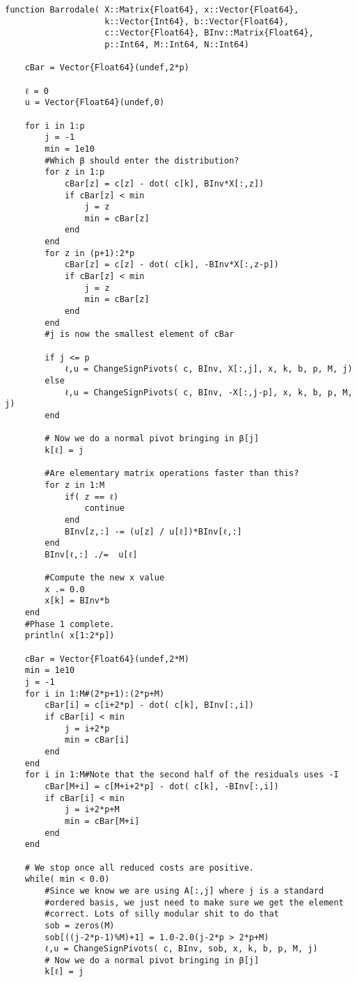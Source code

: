 \documentclass[12pt]{paper}
\begin{document}
\begin{verbatim}
function Barrodale( X::Matrix{Float64}, x::Vector{Float64},
                    k::Vector{Int64}, b::Vector{Float64},
                    c::Vector{Float64}, BInv::Matrix{Float64},
                    p::Int64, M::Int64, N::Int64)

    cBar = Vector{Float64}(undef,2*p)

    ℓ = 0
    u = Vector{Float64}(undef,0)

    for i in 1:p
        j = -1
        min = 1e10
        #Which β should enter the distribution?
        for z in 1:p
            cBar[z] = c[z] - dot( c[k], BInv*X[:,z])
            if cBar[z] < min
                j = z
                min = cBar[z]
            end
        end
        for z in (p+1):2*p
            cBar[z] = c[z] - dot( c[k], -BInv*X[:,z-p])
            if cBar[z] < min
                j = z
                min = cBar[z]
            end
        end
        #j is now the smallest element of cBar

        if j <= p 
            ℓ,u = ChangeSignPivots( c, BInv, X[:,j], x, k, b, p, M, j)
        else
            ℓ,u = ChangeSignPivots( c, BInv, -X[:,j-p], x, k, b, p, M, j)
        end

        # Now we do a normal pivot bringing in β[j]
        k[ℓ] = j

        #Are elementary matrix operations faster than this?
        for z in 1:M
            if( z == ℓ)
                continue
            end
            BInv[z,:] -= (u[z] / u[ℓ])*BInv[ℓ,:]
        end
        BInv[ℓ,:] ./=  u[ℓ]

        #Compute the new x value
        x .= 0.0
        x[k] = BInv*b
    end
    #Phase 1 complete.
    println( x[1:2*p])

    cBar = Vector{Float64}(undef,2*M)
    min = 1e10
    j = -1
    for i in 1:M#(2*p+1):(2*p+M)
        cBar[i] = c[i+2*p] - dot( c[k], BInv[:,i])
        if cBar[i] < min
            j = i+2*p
            min = cBar[i]
        end
    end
    for i in 1:M#Note that the second half of the residuals uses -I 
        cBar[M+i] = c[M+i+2*p] - dot( c[k], -BInv[:,i])
        if cBar[i] < min
            j = i+2*p+M
            min = cBar[M+i]
        end
    end

    # We stop once all reduced costs are positive.
    while( min < 0.0)
        #Since we know we are using A[:,j] where j is a standard
        #ordered basis, we just need to make sure we get the element
        #correct. Lots of silly modular shit to do that
        sob = zeros(M)
        sob[((j-2*p-1)%M)+1] = 1.0-2.0(j-2*p > 2*p+M)
        ℓ,u = ChangeSignPivots( c, BInv, sob, x, k, b, p, M, j)
        # Now we do a normal pivot bringing in β[j]
        k[ℓ] = j


\end{verbatim}
\end{document}
